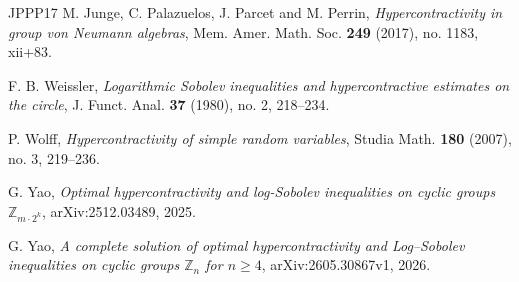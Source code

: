 \documentclass[11pt]{amsart}
\numberwithin{equation}{section}
\theoremstyle{plain}
\theoremstyle{remark}
\newcommand{\ZZ}{\mathbb Z}
\begin{document}
\begin{thebibliography}{JPPP17}
M. Junge, C. Palazuelos, J. Parcet and M. Perrin,
\emph{Hypercontractivity in group von Neumann algebras},
Mem. Amer. Math. Soc. \textbf{249} (2017), no. 1183, xii+83.







F. B. Weissler,
\emph{Logarithmic Sobolev inequalities and hypercontractive estimates on the circle},
J. Funct. Anal. \textbf{37} (1980), no. 2, 218--234.

P. Wolff,
\emph{Hypercontractivity of simple random variables},
Studia Math. \textbf{180} (2007), no. 3, 219--236.

G. Yao,
\emph{Optimal hypercontractivity and log-Sobolev inequalities on cyclic groups
\(\ZZ_{m\cdot2^k}\)},
arXiv:2512.03489, 2025.

G. Yao,
\emph{A complete solution of optimal hypercontractivity and Log--Sobolev
inequalities on cyclic groups \(\ZZ_n\) for \(n\ge4\)},
arXiv:2605.30867v1, 2026.

\end{thebibliography}
\end{document}
